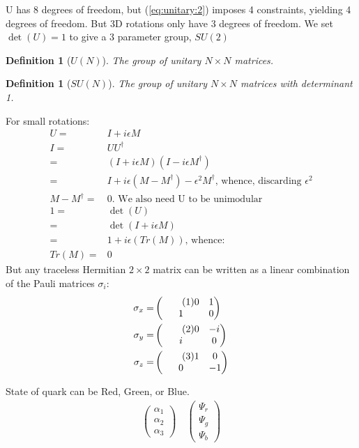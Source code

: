\documentclass[]{article}
\newcommand\numberthis{\addtocounter{equation}{1}\tag{\theequation}}
\newtheorem{defn}[thm]{Definition}
\begin{document}
U has 8 degrees of freedom, but (\ref{eq:unitary:2}) imposes 4 constraints, yielding 4 degrees of freedom. But 3D rotations only have 3 degrees of freedom. We set $\det(U)=1$ to give a 3 parameter group, $SU(2)$

\begin{defn}[$U(N)$]
	The group of unitary $N\times N$ matrices.
\end{defn}

\begin{defn}[$SU(N)$]
	The group of unitary $N\times N$ matrices with determinant 1.
\end{defn}

For small rotations:
\begin{align*}
	U =& I + i \epsilon M \\
	I =&U U^\dagger\\
	 =& (I + i \epsilon M)(I - i\epsilon M^\dagger)\\
	 =& I + i \epsilon(M - M^\dagger) - \epsilon^2 M^\dagger \text{, whence, discarding $\epsilon^2$}\\
	 M - M^\dagger =& 0 \text{. We also need U to be unimodular}\\
	1=&\det(U)\\
	 =& \det( I + i \epsilon M)\\
	=& 1 + i\epsilon(Tr(M)) \text{, whence:}\\
	Tr(M) =&0
\end{align*}
But any traceless Hermitian $2\times2$ matrix can be written as a linear combination of the Pauli  matrices $\sigma_i$:
\begin{align*}
	\sigma_x =& \begin{pmatrix} \numberthis \label{eq:pauli:x}
		0&1\\
		1&0
	\end{pmatrix}\\
	\sigma_y =& \begin{pmatrix} \numberthis \label{eq:pauli:y}
		0&-i\\
		i&0
	\end{pmatrix}\\
	\sigma_z =& \begin{pmatrix} \numberthis \label{eq:pauli:z}
		1&0\\
		0&-1
	\end{pmatrix}
\end{align*}

State of quark can be Red, Green, or Blue. 
\begin{align*}
	\begin{pmatrix}
		\alpha_1\\
		\alpha_2\\
		\alpha_3
	\end{pmatrix} \quad	\begin{pmatrix}
	\Psi_r\\
	\Psi_g\\
	\Psi_b
	\end{pmatrix}
\end{align*}
\end{document}
